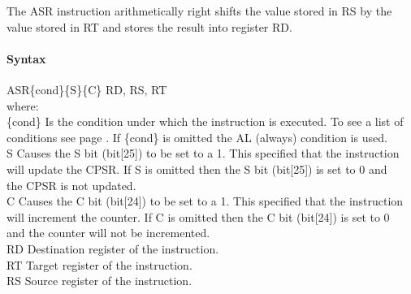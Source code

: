 \documentclass[12pt]{article}
\begin{document}
    \noindent
    The ASR instruction arithmetically right shifts the value stored in RS by the value stored in RT and stores the result into register RD. 
    
    \paragraph{Syntax}
    \begin{flushleft}
    ASR\{cond\}\{S\}\{C\} RD, RS, RT\\
    \vspace{1em}        %
    where:\\
    \vspace{1em}
    \{cond\}    \hspace{2em} Is the condition under which the instruction is executed. To see a list of\\
                \hspace{5.4em} conditions see page . If \{cond\} is omitted the AL (always) condition is used.\\
    \vspace{1em}    
    S       \hspace{4.5em} Causes the S bit (bit[25]) to be set to a 1. This specified that the instruction\\
            \hspace{5.4em} will update the CPSR. If S is omitted then the S bit (bit[25]) is set to 0 and\\
            \hspace{5.4em} the CPSR is not updated.\\
    \vspace{1em}    
    C       \hspace{4.5em} Causes the C bit (bit[24]) to be set to a 1. This specified that the instruction\\
            \hspace{5.4em} will increment the counter. If C is omitted then the C bit (bit[24]) is set to 0\\
            \hspace{5.4em} and the counter will not be incremented.\\
    \vspace{1em}
    RD  \hspace{3.6em} Destination register of the instruction.\\
    \vspace{1em}
    RT  \hspace{3.7em} Target register of the instruction.\\
    \vspace{1em}
    RS  \hspace{3.85em} Source register of the instruction.\\
    \end{flushleft}
    
\end{document}
